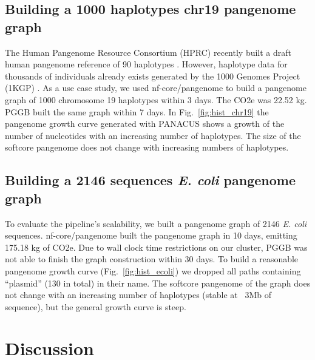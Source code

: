 \documentclass{bioinfo}
\theoremstyle{definition}
\begin{document}
	\subsection{Building a 1000 haplotypes chr19 pangenome graph}
	
	The Human Pangenome Resource Consortium (HPRC) recently built a draft human pangenome reference of 90 haplotypes \citep{Liao2023}. 
	However, haplotype data for thousands of individuals already exists generated by the 1000 Genomes Project (1KGP) \citep{Durbin2010}. 
	As a use case study, we used nf-core/pangenome to build a pangenome graph of 1000 chromosome 19 haplotypes \citep{Kuhnle2020} within 3 days. 
	The CO2e was 22.52 kg. PGGB built the same graph within 7 days. 
	In Fig.~\ref{fig:hist_chr19} the pangenome growth curve generated with PANACUS \citep{Liao2023} shows a growth of the number of nucleotides with an increasing number of haplotypes.
	The size of the softcore pangenome does not change with increasing numbers of haplotypes.
	
	\subsection{Building a 2146 sequences \textit{E. coli} pangenome graph}
	
	To evaluate the pipeline’s scalability, we built a pangenome graph of 2146 \textit{E. coli} sequences. 
	nf-core/pangenome built the pangenome graph in 10 days, emitting 175.18 kg of CO2e. 
	Due to wall clock time restrictions on our cluster, PGGB was not able to finish the graph construction within 30 days. 
	To build a reasonable pangenome growth curve (Fig.~\ref{fig:hist_ecoli}) we dropped all paths containing “plasmid” (130 in total) in their name. 
	The softcore pangenome of the graph does not change with an increasing number of haplotypes (stable at ~3Mb of sequence), but the general growth curve is steep. 

	\vspace{-0.5cm}
	\section{Discussion}
	
\end{document}

